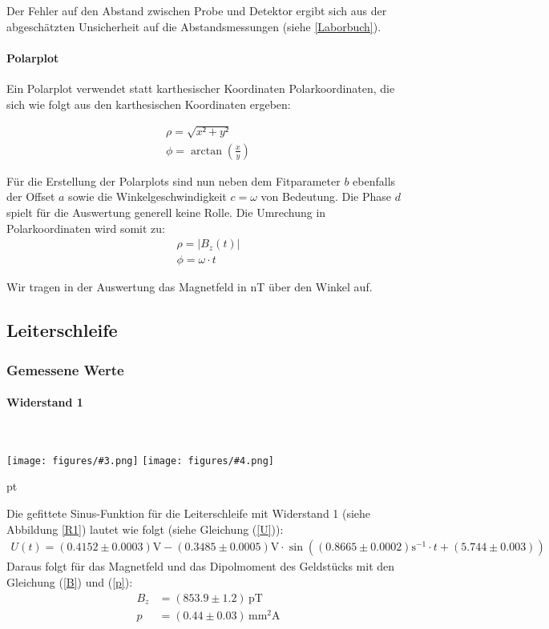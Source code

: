 \documentclass[12pt]{article}
\newcommand{\graTwoB}[5]{
	\begin{minipage}[h!]{\textwidth}
		\centering
		\texttt{[image: figures/\#3.png]}
		\texttt{[image: figures/\#4.png]}
		\captionof{figure}{#5}
	\end{minipage}
	\vskip 30 pt
}
\begin{document}
Der Fehler auf den Abstand zwischen Probe und Detektor ergibt sich aus der abgeschätzten Unsicherheit auf die Abstandsmessungen (siehe \ref{Laborbuch}).	

\paragraph{Polarplot} Ein Polarplot verwendet statt karthesischer Koordinaten Polarkoordinaten, die sich wie folgt aus den karthesischen Koordinaten ergeben:

\begin{align*}
\rho = \sqrt{x²+y²}\\
\phi = \arctan(\frac{x}{y})
\end{align*}

Für die Erstellung der Polarplots sind nun neben dem Fitparameter $b$ ebenfalls der Offset $a$ sowie die Winkelgeschwindigkeit $c = \omega$ von Bedeutung. Die Phase $d$ spielt für die Auswertung generell keine Rolle. Die Umrechung in Polarkoordinaten wird somit zu:
\begin{align*}
\rho = \left| B_z(t) \right| \\
\phi = \omega \cdot t
\end{align*}

Wir tragen in der Auswertung das Magnetfeld in nT über den Winkel auf. 
\newpage
\subsection{Leiterschleife}
\subsubsection{Gemessene Werte }
\paragraph{Widerstand 1}\ \\
\graTwoB{0.65}{0.34}{R1_Sinusfit}{R1_polar-plot}{Widerstand R1 \label{R1}}


Die gefittete Sinus-Funktion für die Leiterschleife mit Widerstand 1 (siehe Abbildung \ref{R1}) lautet wie folgt (siehe Gleichung (\ref{U})):
\begin{align*}
	U(t)=(0.4152\pm0.0003)\mathrm V-(0.3485\pm0.0005)\mathrm V\cdot \sin((0.8665 \pm 0.0002)\mathrm{s^{-1}}\cdot t + (5.744 \pm 0.003))
\end{align*}
Daraus folgt für das Magnetfeld und das Dipolmoment des Geldstücks mit den Gleichung (\ref{B}) und (\ref{p}):
\begin{align*}
	B_z&=(853.9 \pm 1.2)\,\mathrm{pT}\\
	p&=(0.44 \pm 0.03)\,\mathrm{mm^2A}
\end{align*}
\newpage
\end{document}
